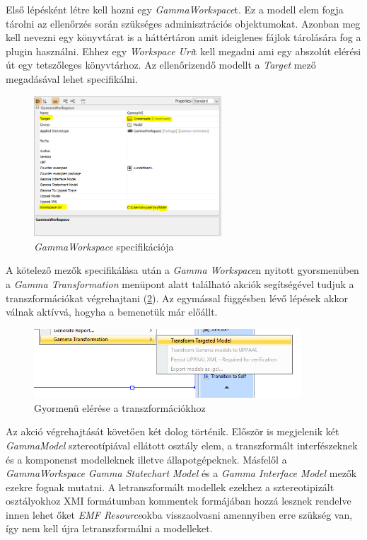 Első lépésként létre kell hozni egy \emph{GammaWorkspace}t. Ez a modell elem fogja tárolni az ellenőrzés során szükséges adminisztrációs objektumokat. Azonban meg kell nevezni egy könyvtárat is a háttértáron amit ideiglenes fájlok tárolására fog a plugin használni. Ehhez egy \emph{Workspace Uri}t kell megadni ami egy abszolút elérési út egy tetszőleges könyvtárhoz. Az ellenőrizendő modellt a \emph{Target} mező megadásával lehet specifikálni.

\begin{figure}[!ht]
	\centering
	\includegraphics[width=7cm, keepaspectratio]{figures/contribution/GammaWS.png}
	\caption{\emph{GammaWorkspace} specifikációja}
	\label{fig:GammaWS}
\end{figure}


A kötelező mezők specifikálása után a \emph{Gamma Workspace}n nyitott gyorsmenüben a \emph{Gamma Transformation} menüpont alatt található akciók segítségével tudjuk a transzformációkat végrehajtani (\ref{fig:gamma-tra}). Az egymással függésben lévő lépések akkor válnak aktívvá, hogyha a bemenetük már előállt.

\begin{figure}[!ht]
	\centering
	\includegraphics[width=10cm, keepaspectratio]{figures/contribution/GammaTransformation.png}
	\caption{Gyormenü elérése a transzformációkhoz}
	\label{fig:gamma-tra}
\end{figure}

Az akció végrehajtását követően két dolog történik. Először is megjelenik két \emph{GammaModel} sztereotípiával ellátott osztály elem, a transzformált interfészeknek és a komponenst modelleknek illetve állapotgépeknek. Másfelől a \emph{GammaWorkspace} \emph{Gamma Statechart Model} és a \emph{Gamma Interface Model} mezők ezekre fognak mutatni. A letranszformált modellek ezekhez a sztereotipizált osztályokhoz XMI formátumban kommentek formájában hozzá lesznek rendelve innen lehet őket \emph{EMF Resource}okba visszaolvasni amennyiben erre szükség van, így nem kell újra letranszformálni a modelleket.

